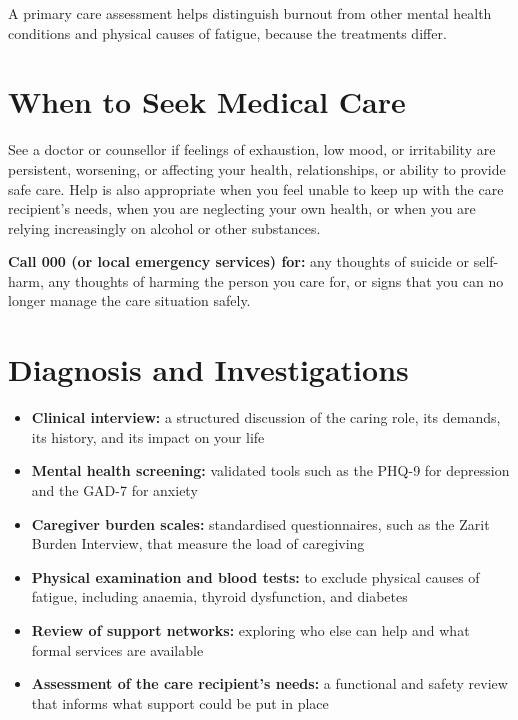 A primary care assessment helps distinguish burnout from other mental health conditions and physical causes of fatigue, because the treatments differ.

\section*{When to Seek Medical Care}
See a doctor or counsellor if feelings of exhaustion, low mood, or irritability are persistent, worsening, or affecting your health, relationships, or ability to provide safe care. Help is also appropriate when you feel unable to keep up with the care recipient's needs, when you are neglecting your own health, or when you are relying increasingly on alcohol or other substances.

\textbf{Call 000 (or local emergency services) for:} any thoughts of suicide or self-harm, any thoughts of harming the person you care for, or signs that you can no longer manage the care situation safely.

\section*{Diagnosis and Investigations}
\begin{itemize}
    \item \textbf{Clinical interview:} a structured discussion of the caring role, its demands, its history, and its impact on your life
    \item \textbf{Mental health screening:} validated tools such as the PHQ-9 for depression and the GAD-7 for anxiety
    \item \textbf{Caregiver burden scales:} standardised questionnaires, such as the Zarit Burden Interview, that measure the load of caregiving
    \item \textbf{Physical examination and blood tests:} to exclude physical causes of fatigue, including anaemia, thyroid dysfunction, and diabetes
    \item \textbf{Review of support networks:} exploring who else can help and what formal services are available
    \item \textbf{Assessment of the care recipient's needs:} a functional and safety review that informs what support could be put in place
\end{itemize}

